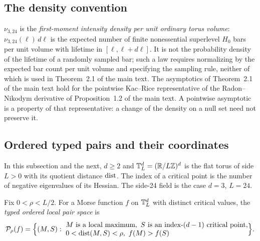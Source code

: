 \subsection{The density convention}\label{ssec:setting-density}

\begin{convention}[density]\label{conv:setting-density}
$\nu_{3,24}$ is the \emph{first-moment intensity density per unit ordinary torus volume}: $\nu_{3,24}(\ell)\,d\ell$ is the expected number of finite nonessential superlevel $H_0$ bars per unit volume with lifetime in $[\ell,\ell+d\ell]$. It is not the probability density of the lifetime of a randomly sampled bar; such a law requires normalizing by the expected bar count per unit volume and specifying the sampling rule, neither of which is used in Theorem~2.1 of the main text. The asymptotics of Theorem~2.1 of the main text hold for the pointwise Kac--Rice representative of the Radon--Nikodym derivative of Proposition~1.2 of the main text. A pointwise asymptotic is a property of that representative: a change of the density on a null set need not preserve it.
\end{convention}

\subsection{Ordered typed pairs and their coordinates}\label{ssec:setting-pairs}

In this subsection and the next, $d\ge2$ and $\mathbb T^d_L=(\mathbb R/L\mathbb Z)^d$ is the flat torus of side $L>0$ with its quotient distance $\operatorname{dist}$. The index of a critical point is the number of negative eigenvalues of its Hessian. The side-24 field is the case $d=3$, $L=24$.

\begin{definition}\label{def:setting-pairspace}
Fix $0<\rho<L/2$. For a Morse function $f$ on $\mathbb T^d_L$ with distinct critical values, the \emph{typed ordered local pair space} is
\begin{equation}\label{eq:setting-pairspace}
\mathcal P_\rho(f)=\Bigl\{(M,S):\ \begin{array}{@{}l@{}}M\text{ is a local maximum},\ S\text{ is an index-}(d-1)\text{ critical point},\\ 0<\dist(M,S)<\rho,\ f(M)>f(S)\end{array}\Bigr\}.
\end{equation}
\end{definition}

